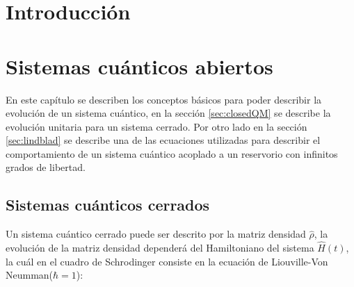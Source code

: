 %
%

\chapter{Introducción}





\chapter{Sistemas cuánticos abiertos}

En este capítulo se describen los conceptos básicos para poder describir la evolución de un sistema cuántico, en la sección \ref{sec:closedQM} se describe la evolución unitaria para un sistema cerrado.  Por otro lado en la sección \ref{sec:lindblad} se describe una de las ecuaciones utilizadas para describir el comportamiento de un sistema cuántico acoplado a un reservorio con infinitos grados de libertad.


\section{Sistemas cuánticos cerrados}
Un sistema cuántico cerrado puede ser descrito por la matriz densidad $\hat{\rho}$, la evolución de la matriz densidad dependerá del Hamiltoniano del sistema $\hat{H}(t)$, la cuál en el cuadro de Schrodinger consiste en la ecuación de Liouville-Von Neumman($\hbar = 1$)\cite{breuer2002theory}:

